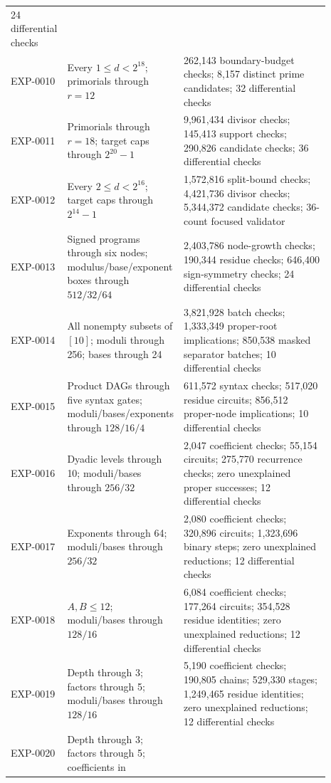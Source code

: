\documentclass[11pt]{article}
\begin{document}
\begin{center}
\begin{tabular}{L{0.12\linewidth}L{0.28\linewidth}L{0.49\linewidth}}
24 differential checks \\
\addlinespace
EXP-0010 & Every \(1\le d<2^{18}\); primorials through \(r=12\) &
262,143 boundary-budget checks; 8,157 distinct prime candidates;
32 differential checks \\
\addlinespace
EXP-0011 & Primorials through \(r=18\); target caps through \(2^{20}-1\) &
9,961,434 divisor checks; 145,413 support checks; 290,826 candidate checks;
36 differential checks \\
\addlinespace
EXP-0012 & Every \(2\le d<2^{16}\); target caps through \(2^{14}-1\) &
1,572,816 split-bound checks; 4,421,736 divisor checks; 5,344,372 candidate
checks; 36-count focused validator \\
\addlinespace
EXP-0013 & Signed programs through six nodes; modulus/base/exponent boxes
through \(512/32/64\) &
2,403,786 node-growth checks; 190,344 residue checks; 646,400 sign-symmetry
checks; 24 differential checks \\
\addlinespace
EXP-0014 & All nonempty subsets of \([10]\); moduli through 256; bases
through 24 &
3,821,928 batch checks; 1,333,349 proper-root implications; 850,538 masked
separator batches; 10 differential checks \\
\addlinespace
EXP-0015 & Product DAGs through five syntax gates; moduli/bases/exponents
through \(128/16/4\) &
611,572 syntax checks; 517,020 residue circuits; 856,512 proper-node
implications; 10 differential checks \\
\addlinespace
EXP-0016 & Dyadic levels through 10; moduli/bases through \(256/32\) &
2,047 coefficient checks; 55,154 circuits; 275,770 recurrence checks;
zero unexplained proper successes; 12 differential checks \\
\addlinespace
EXP-0017 & Exponents through 64; moduli/bases through \(256/32\) &
2,080 coefficient checks; 320,896 circuits; 1,323,696 binary steps;
zero unexplained reductions; 12 differential checks \\
\addlinespace
EXP-0018 & \(A,B\le12\); moduli/bases through \(128/16\) &
6,084 coefficient checks; 177,264 circuits; 354,528 residue identities;
zero unexplained reductions; 12 differential checks \\
\addlinespace
EXP-0019 & Depth through 3; factors through 5; moduli/bases through \(128/16\) &
5,190 coefficient checks; 190,805 chains; 529,330 stages; 1,249,465 residue
identities; zero unexplained reductions; 12 differential checks \\
\addlinespace
EXP-0020 & Depth through 3; factors through 5; coefficients in

\end{tabular}
\end{center}
\end{document}

